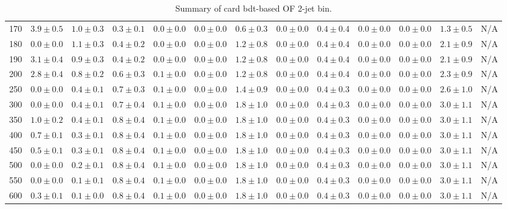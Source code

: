 \begin{table}
{\begin{center}
\begin{tabular}{l | c c | c c c c c c c c  | c c}
170 & $3.9\pm0.5$ & $1.0\pm0.3$ & $0.3\pm0.1$ & $0.0\pm0.0$ & $0.0\pm0.0$ & $0.6\pm0.3$ & $0.0\pm0.0$ & $0.4\pm0.4$ & $0.0\pm0.0$ & $0.0\pm0.0$ & $1.3\pm0.5$ & N/A \\
180 & $0.0\pm0.0$ & $1.1\pm0.3$ & $0.4\pm0.2$ & $0.0\pm0.0$ & $0.0\pm0.0$ & $1.2\pm0.8$ & $0.0\pm0.0$ & $0.4\pm0.4$ & $0.0\pm0.0$ & $0.0\pm0.0$ & $2.1\pm0.9$ & N/A \\
190 & $3.1\pm0.4$ & $0.9\pm0.3$ & $0.4\pm0.2$ & $0.0\pm0.0$ & $0.0\pm0.0$ & $1.2\pm0.8$ & $0.0\pm0.0$ & $0.4\pm0.4$ & $0.0\pm0.0$ & $0.0\pm0.0$ & $2.1\pm0.9$ & N/A \\
200 & $2.8\pm0.4$ & $0.8\pm0.2$ & $0.6\pm0.3$ & $0.1\pm0.0$ & $0.0\pm0.0$ & $1.2\pm0.8$ & $0.0\pm0.0$ & $0.4\pm0.4$ & $0.0\pm0.0$ & $0.0\pm0.0$ & $2.3\pm0.9$ & N/A \\
250 & $0.0\pm0.0$ & $0.4\pm0.1$ & $0.7\pm0.3$ & $0.1\pm0.0$ & $0.0\pm0.0$ & $1.4\pm0.9$ & $0.0\pm0.0$ & $0.4\pm0.3$ & $0.0\pm0.0$ & $0.0\pm0.0$ & $2.6\pm1.0$ & N/A \\
300 & $0.0\pm0.0$ & $0.4\pm0.1$ & $0.7\pm0.4$ & $0.1\pm0.0$ & $0.0\pm0.0$ & $1.8\pm1.0$ & $0.0\pm0.0$ & $0.4\pm0.3$ & $0.0\pm0.0$ & $0.0\pm0.0$ & $3.0\pm1.1$ & N/A \\
350 & $1.0\pm0.2$ & $0.4\pm0.1$ & $0.8\pm0.4$ & $0.1\pm0.0$ & $0.0\pm0.0$ & $1.8\pm1.0$ & $0.0\pm0.0$ & $0.4\pm0.3$ & $0.0\pm0.0$ & $0.0\pm0.0$ & $3.0\pm1.1$ & N/A \\
400 & $0.7\pm0.1$ & $0.3\pm0.1$ & $0.8\pm0.4$ & $0.1\pm0.0$ & $0.0\pm0.0$ & $1.8\pm1.0$ & $0.0\pm0.0$ & $0.4\pm0.3$ & $0.0\pm0.0$ & $0.0\pm0.0$ & $3.0\pm1.1$ & N/A \\
450 & $0.5\pm0.1$ & $0.3\pm0.1$ & $0.8\pm0.4$ & $0.1\pm0.0$ & $0.0\pm0.0$ & $1.8\pm1.0$ & $0.0\pm0.0$ & $0.4\pm0.3$ & $0.0\pm0.0$ & $0.0\pm0.0$ & $3.0\pm1.1$ & N/A \\
500 & $0.0\pm0.0$ & $0.2\pm0.1$ & $0.8\pm0.4$ & $0.1\pm0.0$ & $0.0\pm0.0$ & $1.8\pm1.0$ & $0.0\pm0.0$ & $0.4\pm0.3$ & $0.0\pm0.0$ & $0.0\pm0.0$ & $3.0\pm1.1$ & N/A \\
550 & $0.0\pm0.0$ & $0.1\pm0.1$ & $0.8\pm0.4$ & $0.1\pm0.0$ & $0.0\pm0.0$ & $1.8\pm1.0$ & $0.0\pm0.0$ & $0.4\pm0.3$ & $0.0\pm0.0$ & $0.0\pm0.0$ & $3.0\pm1.1$ & N/A \\
600 & $0.3\pm0.1$ & $0.1\pm0.0$ & $0.8\pm0.4$ & $0.1\pm0.0$ & $0.0\pm0.0$ & $1.8\pm1.0$ & $0.0\pm0.0$ & $0.4\pm0.3$ & $0.0\pm0.0$ & $0.0\pm0.0$ & $3.0\pm1.1$ & N/A \\
\hline
\end{tabular}
\end{center}
}
\caption{Summary of card bdt-based OF 2-jet bin.}
\end{table}
